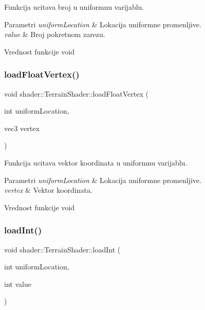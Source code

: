 Funkcija ucitava broj u uniformnu varijablu. 


\begin{DoxyParams}{Parametri}
{\em uniform\+Location} & Lokacija uniformne promenljive. \\
\hline
{\em value} & Broj pokretnom zarezu. \\
\hline
\end{DoxyParams}
\begin{DoxyReturn}{Vrednost funkcije}
void 
\end{DoxyReturn}
\mbox{\label{classshader_1_1TerrainShader_aa980b906e1d8b02a1427fea028750e14}} 
\subsubsection{\texorpdfstring{load\+Float\+Vertex()}{loadFloatVertex()}}
{\footnotesize\ttfamily void shader\+::\+Terrain\+Shader\+::load\+Float\+Vertex (\begin{DoxyParamCaption}\item[{int}]{uniform\+Location,  }\item[{vec3}]{vertex }\end{DoxyParamCaption})}



Funkcija ucitava vektor koordinata u uniformnu varijablu. 


\begin{DoxyParams}{Parametri}
{\em uniform\+Location} & Lokacija uniformne promenljive. \\
\hline
{\em vertex} & Vektor koordinata. \\
\hline
\end{DoxyParams}
\begin{DoxyReturn}{Vrednost funkcije}
void 
\end{DoxyReturn}
\mbox{\label{classshader_1_1TerrainShader_ae4ccafdcc22f15cdbc104d416decd294}} 
\subsubsection{\texorpdfstring{load\+Int()}{loadInt()}}
{\footnotesize\ttfamily void shader\+::\+Terrain\+Shader\+::load\+Int (\begin{DoxyParamCaption}\item[{int}]{uniform\+Location,  }\item[{int}]{value }\end{DoxyParamCaption})}




